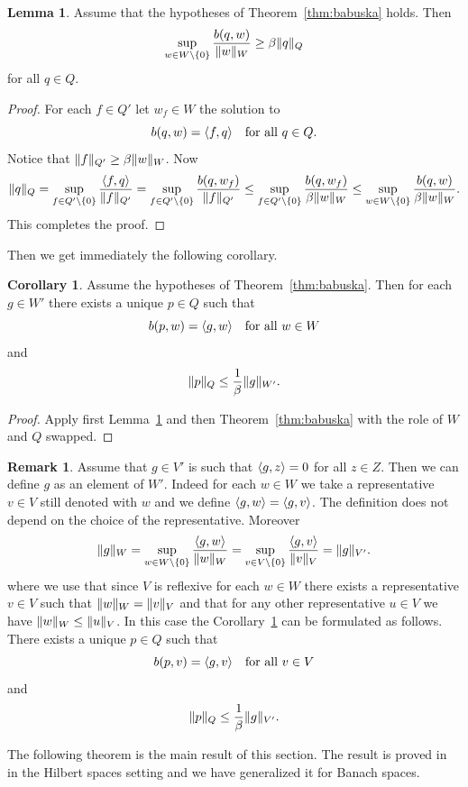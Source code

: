 \documentclass[a4paper,10pt,twoside]{amsbook}
\numberwithin{section}{chapter}
\numberwithin{equation}{chapter}
\theoremstyle{definition}
\newtheorem{cor}[prop]{Corollary}
\newtheorem{lemma}[prop]{Lemma}
\newtheorem{rmk}[prop]{Remark}
\DeclarePairedDelimiter{\norm}{\lVert}{\rVert}
\DeclarePairedDelimiter{\dual}{\langle}{\rangle}
\begin{document}
\begin{lemma}
\label{lemma:babuska}
Assume that the hypotheses of Theorem~\ref{thm:babuska} holds. Then
\[
\sup_{w\in W\setminus\{0\}}\frac{b(q,w)}{\norm{w}_W}\ge\beta\norm{q}_Q
\]
for all $q\in Q$.
\end{lemma}
\begin{proof}
For each $f\in Q'$ let $w_f\in W$ the solution to
\[
b(q,w)=\dual{f,q}\quad\text{for all $q\in Q$}.
\]
Notice that $\norm{f}_{Q'}\ge\beta\norm{w}_W$. Now
\[
\norm{q}_Q=\sup_{f\in Q'\setminus\{0\}}\frac{\dual{f,q}}{\norm{f}_{Q'}}=\sup_{f\in Q'\setminus\{0\}}\frac{b(q,w_f)}{\norm{f}_{Q'}}\le\sup_{f\in Q'\setminus\{0\}}\frac{b(q,w_f)}{\beta\norm{w}_{W}}\le\sup_{w\in W\setminus\{0\}}\frac{b(q,w)}{\beta\norm{w}_W}.
\]
This completes the proof.
\end{proof}
Then we get immediately the following corollary.
\begin{cor}
\label{cor:babuska}
Assume the hypotheses of Theorem~\ref{thm:babuska}. Then for each $g\in W'$ there exists a unique $p\in Q$ such that
\[
b(p,w)=\dual{g,w}\quad\text{for all $w\in W$}
\]
and
\[
\norm{p}_Q\le\frac{1}{\beta}\norm{g}_{W'}.
\]
\end{cor}
\begin{proof}
Apply first Lemma~\ref{lemma:babuska} and then Theorem~\ref{thm:babuska} with the role of $W$ and $Q$ swapped.
\end{proof}
\begin{rmk}
\label{rmk:babuska}
Assume that $g\in V'$ is such that $\dual{g,z}=0$ for all $z\in Z$. Then we can define $g$ as an element of $W'$. Indeed for each $w\in W$ we take a representative $v\in V$ still denoted with $w$ and we define $\dual{g,w}=\dual{g,v}$. The definition does not depend on the choice of the representative. Moreover
\[
\norm{g}_{W}=\sup_{w\in W\setminus\{0\}}\frac{\dual{g,w}}{\norm{w}_W}=\sup_{v\in V\setminus\{0\}}\frac{\dual{g,v}}{\norm{v}_V}=\norm{g}_{V'}.
\]
where we use that since $V$ is reflexive for each $w\in W$ there exists a representative $v\in V$ such that $\norm{w}_W=\norm{v}_V$ and that for any other representative $u\in V$ we have $\norm{w}_W\le\norm{u}_V$. In this case the Corollary~\ref{cor:babuska} can be formulated as follows. There exists a unique $p\in Q$ such that
\[
b(p,v)=\dual{g,v}\quad\text{for all $v\in V$}
\]
and
\[
\norm{p}_Q\le\frac{1}{\beta}\norm{g}_{V'}.
\]
\end{rmk}
The following theorem is the main result of this section. The result is proved in~\cite{nicolaides} in the Hilbert spaces setting and we have generalized it for Banach spaces.
\end{document}
